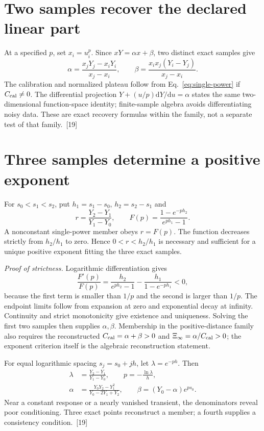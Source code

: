 \documentclass[10pt,twocolumn,letterpaper]{article}
\newcommand{\dd}{\mathrm{d}}
\begin{document}
\section{Two samples recover the declared linear part}
At a specified $p$, set $x_i=u_i^p$. Since $xY=\alpha x+\beta$, two distinct exact samples give
\[
 \alpha=\frac{x_jY_j-x_iY_i}{x_j-x_i},\qquad
 \beta=\frac{x_ix_j(Y_i-Y_j)}{x_j-x_i}.
\]
The calibration and normalized plateau follow from Eq.~\eqref{eq:single-power} if $C_{\rm cal}\ne 0$. The differential projection $Y+(u/p)\dd Y/\dd u=\alpha$ states the same two-dimensional function-space identity; finite-sample algebra avoids differentiating noisy data. These are exact recovery formulas within the family, not a separate test of that family.~[19]

\section{Three samples determine a positive exponent}
For $s_0<s_1<s_2$, put $h_1=s_1-s_0$, $h_2=s_2-s_1$ and
\[
 r=\frac{Y_2-Y_1}{Y_1-Y_0},\qquad
 F(p)=\frac{1-e^{-ph_2}}{e^{ph_1}-1}.
\]
A nonconstant single-power member obeys $r=F(p)$. The function decreases strictly from $h_2/h_1$ to zero. Hence $0<r<h_2/h_1$ is necessary and sufficient for a unique positive exponent fitting the three exact samples.

\noindent\textit{Proof of strictness.} Logarithmic differentiation gives
\[
 \frac{F'(p)}{F(p)}=
 \frac{h_2}{e^{ph_2}-1}-\frac{h_1}{1-e^{-ph_1}}<0,
\]
because the first term is smaller than $1/p$ and the second is larger than $1/p$. The endpoint limits follow from expansion at zero and exponential decay at infinity. Continuity and strict monotonicity give existence and uniqueness. Solving the first two samples then supplies $\alpha,\beta$. Membership in the positive-distance family also requires the reconstructed $C_{\rm cal}=\alpha+\beta>0$ and $\Xi_\infty=\alpha/C_{\rm cal}>0$; the exponent criterion itself is the algebraic reconstruction statement.

For equal logarithmic spacing $s_j=s_0+jh$, let $\lambda=e^{-ph}$. Then
\[
\begin{aligned}
 \lambda&=\frac{Y_2-Y_1}{Y_1-Y_0},\qquad p=-\frac{\ln\lambda}{h},\\
 \alpha&=\frac{Y_0Y_2-Y_1^2}{Y_0-2Y_1+Y_2},\qquad
 \beta=(Y_0-\alpha)e^{ps_0}.
\end{aligned}
\]
Near a constant response or a nearly vanished transient, the denominators reveal poor conditioning. Three exact points reconstruct a member; a fourth supplies a consistency condition.~[19]
\end{document}
